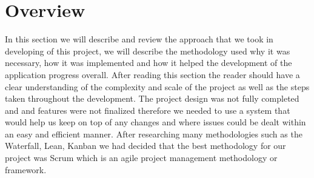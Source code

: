 \documentclass[a4paper,12pt]{report}
\begin{document}
\section{Overview}
In this section we will describe and review the approach that we took in developing of this project, we will describe the methodology used why it was necessary, how it was implemented and how it helped the development of the application progress overall.
After reading this section the reader should have a clear understanding of the complexity and scale of the project as well as the steps taken throughout the development.
The project design was not fully completed and and features were not finalized therefore we needed to use a system that would help us keep on top of any changes and where issues could be dealt within an easy and efficient manner.
After researching many methodologies such as the Waterfall, Lean, Kanban we had decided that the best methodology for our project was Scrum which is an agile project management methodology or framework.
\\\\\\\\\\
\end{document}
